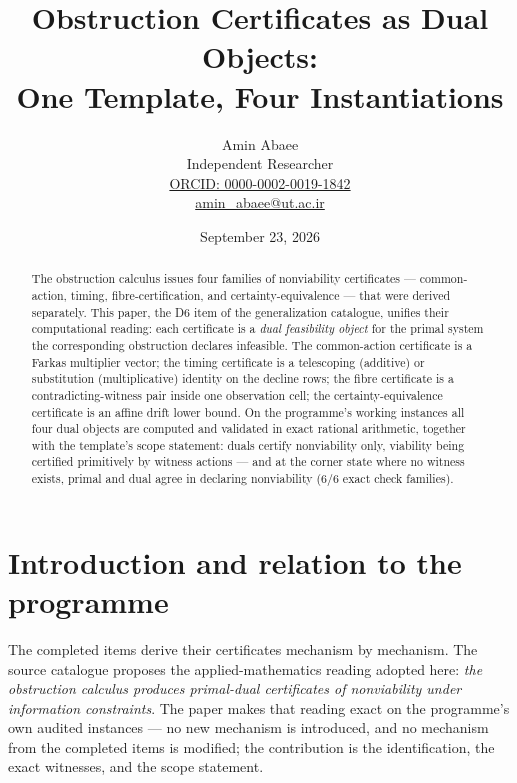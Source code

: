 \documentclass[10pt,twocolumn]{article}
\theoremstyle{definition}
\begin{document}
\title{Obstruction Certificates as Dual Objects:\\ One Template, Four Instantiations}
\author{Amin Abaee\\[0.35em]
{\small Independent Researcher}\\[0.55em]
{\small\href{https://orcid.org/0000-0002-0019-1842}{ORCID: 0000-0002-0019-1842}}\\[0.3em]
{\small\href{mailto:amin\_abaee@ut.ac.ir}{amin\_abaee@ut.ac.ir}}}
\date{September 23, 2026}
\maketitle

\begin{abstract}
The obstruction calculus issues four families of nonviability certificates
--- common-action, timing, fibre-certification, and certainty-equivalence
--- that were derived separately. This paper, the D6 item of the
generalization catalogue, unifies their computational reading: each
certificate is a \emph{dual feasibility object} for the primal system the
corresponding obstruction declares infeasible. The common-action
certificate is a Farkas multiplier vector; the timing certificate is a
telescoping (additive) or substitution (multiplicative) identity on the
decline rows; the fibre certificate is a contradicting-witness pair inside
one observation cell; the certainty-equivalence certificate is an affine
drift lower bound. On the programme's working instances all four dual
objects are computed and validated in exact rational arithmetic, together
with the template's scope statement: duals certify nonviability only,
viability being certified primitively by witness actions --- and at the
corner state where no witness exists, primal and dual agree in declaring
nonviability (6/6 exact check families).
\end{abstract}

\section{Introduction and relation to the programme}

The completed items derive their certificates mechanism by mechanism. The
source catalogue proposes the applied-mathematics reading adopted here:
\emph{the obstruction calculus produces primal-dual certificates of
nonviability under information constraints}. The paper makes that reading
exact on the programme's own audited instances --- no new mechanism is
introduced, and no mechanism from the completed items is modified; the
contribution is the identification, the exact witnesses, and the scope
statement.
\end{document}

